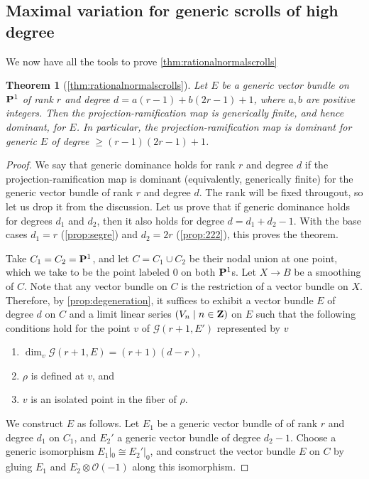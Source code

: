 \documentclass[11pt,reqno]{amsart}
\theoremstyle{plain}
\newtheorem{theorem}{Theorem}[section]
\theoremstyle{definition}
\theoremstyle{remark}
\numberwithin{equation}{section}
\renewcommand{\to}{{\longrightarrow}}
\numberwithin{equation}{section}
\renewcommand{\O}{\mathcal O}
\begin{document}
\subsection{Maximal variation for generic scrolls of high degree}
We now have all the tools to prove \autoref{thm:rationalnormalscrolls}
\begin{theorem}[\autoref{thm:rationalnormalscrolls}]
  Let $E$ be a generic vector bundle on $\P^1$ of rank $r$ and degree $d = a(r-1) + b(2r-1)+1$, where $a, b$ are positive integers.
  Then the projection-ramification map is generically finite, and hence dominant, for $E$.
  In particular, the projection-ramification map is dominant for generic $E$ of degree $\geq (r-1)(2r-1)+1$.
\end{theorem}
\begin{proof}
  We say that generic dominance holds for rank $r$ and degree $d$ if the projection-ramification map is dominant (equivalently, generically finite) for the generic vector bundle of rank $r$ and degree $d$.
  The rank will be fixed througout, so let us drop it from the discussion.
  Let us prove that if generic dominance holds for degrees $d_1$ and $d_2$, then it also holds for degree $d = d_1 + d_2 - 1 $.
  With the base cases $d_1 = r$ (\autoref{prop:segre}) and $d_2 = 2r$ (\autoref{prop:222}), this proves the theorem.

  Take $C_1 = C_2 = \P^1$, and let $C = C_1 \cup C_2$ be their nodal union at one point, which we take to be the point labeled $0$ on both $\P^1$s.
  Let $X \to B$ be a smoothing of $C$.
  Note that any vector bundle on $C$ is the restriction of a vector bundle on $X$.
  Therefore, by \autoref{prop:degeneration}, it suffices to exhibit a vector bundle $E$ of degree $d$ on $C$ and a limit linear series $(V_n \mid n \in \Z)$ on $E$ such that the following conditions hold for the point $v$ of $\mathcal G (r+1, E')$ represented by $v$
  \begin{enumerate}
  \item $\dim_v \mathcal G(r+1, E) = (r+1)(d-r)$,
  \item $\rho$ is defined at $v$, and
  \item $v$ is an isolated point in the fiber of $\rho$.
  \end{enumerate}

  We construct $E$ as follows.
  Let $E_1$ be a generic vector bundle of of rank $r$ and degree $d_1$ on $C_1$, and $E_2'$ a generic vector bundle of degree $d_2 - 1$.
  Choose a generic isomorphism $E_1|_0 \cong E_2'|_0$, and construct the vector bundle $E$ on $C$ by gluing $E_1$ and $E_2 \otimes \O(-1)$ along this isomorphism.
  


\end{proof}
\end{document}
